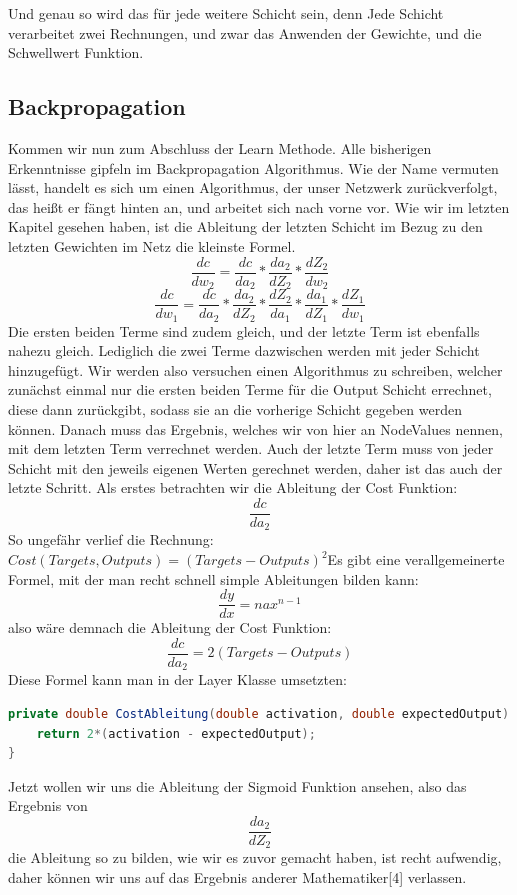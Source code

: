 \documentclass[12pt]{article}
\begin{document}
Und genau so wird das für jede weitere Schicht sein, denn Jede Schicht verarbeitet zwei Rechnungen, und zwar das Anwenden der Gewichte, und die Schwellwert Funktion.\subsection{Backpropagation}Kommen wir nun zum Abschluss der Learn Methode. Alle bisherigen Erkenntnisse gipfeln im Backpropagation Algorithmus. Wie der Name vermuten lässt, handelt es sich um einen Algorithmus, der unser Netzwerk zurückverfolgt, das heißt er fängt hinten an, und arbeitet sich nach vorne vor. 
Wie wir im letzten Kapitel gesehen haben, ist die Ableitung der letzten Schicht im Bezug zu den letzten Gewichten im Netz die kleinste Formel. 
$$\frac{ dc }{ dw_{ 2 } }=
\frac{ dc }{ da_{ 2 } }*
\frac{ da_{ 2 } }{ dZ_{ 2 } }*
\frac{ dZ_{ 2 } }{ dw_{ 2 } }$$
$$\frac{ dc }{ dw_{ 1 } }=
\frac{ dc }{ da_{ 2 } }*
\frac{ da_{ 2 } }{ dZ_{ 2 } }*
\frac{ dZ_{ 2 } }{ da_{ 1 } }*
\frac{ da_{ 1 } }{ dZ_{ 1 } }*
\frac{ dZ_{ 1 } }{ dw_{ 1 } }$$
Die ersten beiden Terme sind zudem gleich, und der letzte Term ist ebenfalls nahezu gleich. Lediglich die zwei Terme dazwischen werden mit jeder Schicht hinzugefügt. Wir werden also versuchen einen Algorithmus zu schreiben, welcher zunächst einmal nur die ersten beiden Terme für die Output Schicht errechnet, diese dann zurückgibt, sodass sie an die vorherige Schicht gegeben werden können. Danach muss das Ergebnis, welches wir von hier an NodeValues nennen, mit dem letzten Term verrechnet werden. Auch der letzte Term muss von jeder Schicht mit den jeweils eigenen Werten gerechnet werden, daher ist das auch der letzte Schritt. Als erstes betrachten wir die Ableitung der Cost Funktion:
$$\frac{ dc }{ da_{ 2 } }$$
So ungefähr verlief die Rechnung:
$Cost(Targets, Outputs) = (Targets - Outputs)^2$Es gibt eine verallgemeinerte Formel, mit der man recht schnell simple Ableitungen bilden kann:
$$\frac{dy}{dx}=nax^{n-1}$$
also wäre demnach die Ableitung der Cost Funktion:
$$\frac{dc}{da_2}=2(Targets-Outputs)$$
Diese Formel kann man in der Layer Klasse umsetzten:\begin{lstlisting}[language=Java]
private double CostAbleitung(double activation, double expectedOutput) {
    return 2*(activation - expectedOutput);
}
\end{lstlisting}
Jetzt wollen wir uns die Ableitung der Sigmoid Funktion ansehen, also das Ergebnis von
$$\frac{da_2}{dZ_2}$$
die Ableitung so zu bilden, wie wir es zuvor gemacht haben, ist recht aufwendig, daher können wir uns auf das Ergebnis anderer Mathematiker[4] verlassen.
\end{document}
